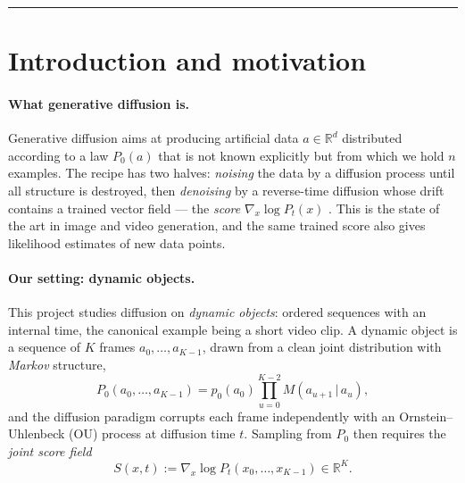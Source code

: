 \documentclass[11pt]{article}
\theoremstyle{definition}
\newcommand{\R}{\mathbb{R}}
\newcommand{\given}{\,|\,}
\begin{document}
\tableofcontents
\medskip
\hrule
\medskip

\section{Introduction and motivation}\label{sec:intro}

\paragraph{What generative diffusion is.}
Generative diffusion aims at producing artificial data $a\in\R^d$ distributed
according to a law $P_0(a)$ that is not known explicitly but from which we
hold $n$ examples. The recipe has two halves: \emph{noising} the data by a
diffusion process until all structure is destroyed, then \emph{denoising} by a
reverse-time diffusion whose drift contains a trained vector field --- the
\emph{score} $\nabla_x\log P_t(x)$
\citep{mezard2025generative,song2021scorebased,vincent2011connection}. This is
the state of the art in image and video generation, and the same trained score
also gives likelihood estimates of new data points.

\paragraph{Our setting: dynamic objects.}
This project studies diffusion on \emph{dynamic objects}: ordered sequences
with an internal time, the canonical example being a short video clip. A
dynamic object is a sequence of $K$ frames $a_0,\dots,a_{K-1}$, drawn from a
clean joint distribution with \emph{Markov} structure,
\begin{equation}\label{eq:chain-prior}
  P_0(a_0,\dots,a_{K-1})=p_0(a_0)\prod_{u=0}^{K-2}M(a_{u+1}\given a_u),
\end{equation}
and the diffusion paradigm corrupts each frame independently with an
Ornstein--Uhlenbeck (OU) process at diffusion time $t$. Sampling from $P_0$
then requires the \emph{joint score field}
\begin{equation}\label{eq:joint-score-def}
  S(x,t):=\nabla_x\log P_t(x_0,\dots,x_{K-1})\in\R^{K}.
\end{equation}
\end{document}
